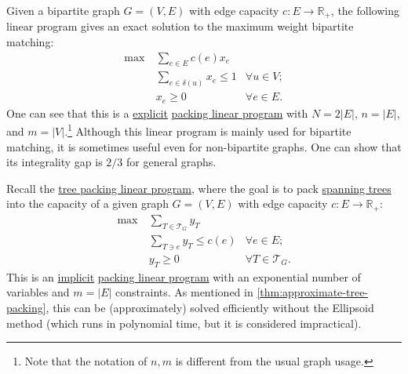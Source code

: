 \begin{eg}\label{eg:max-weight-bipartite-matching-MWU}
	Given a bipartite graph \(G = (V, E)\) with edge capacity \(c \colon E \to \mathbb{R} _{+}\), the following linear program gives an exact solution to the maximum weight bipartite matching:
	\[
		\begin{aligned}
			\max~ & \sum_{e \in E} c(e) x_e                                \\
			      & \sum_{e \in \delta (u)} x_e \leq 1 & \forall u \in V ; \\
			      & x_e \geq 0                         & \forall e \in E.
		\end{aligned}
	\]
	One can see that this is a \hyperref[def:explicit-LP]{explicit} \hyperref[def:packing-LP]{packing linear program} with \(N = 2 \lvert E \rvert \), \(n = \lvert E \rvert \), and \(m = \lvert V \rvert \).\footnote{Note that the notation of \(n, m\) is different from the usual graph usage.} Although this linear program is mainly used for bipartite matching, it is sometimes useful even for non-bipartite graphs. One can show that its integrality gap is \(2 / 3\) for general graphs.
\end{eg}

\begin{eg}\label{eg:tree-packing-MWU}
	Recall the \hyperref[eq:tree-packing-LP]{tree packing linear program}, where the goal is to pack \hyperref[def:spanning-tree]{spanning trees} into the capacity of a given graph \(G = (V, E)\) with edge capacity \(c \colon E \to \mathbb{R} _{+}\):
	\[
		\begin{aligned}
			\max~ & \sum_{T \in \mathcal{T} _G} y_T                                 \\
			      & \sum_{T \ni e} y_T \leq c(e)    & \forall e \in E;              \\
			      & y_T \geq 0                      & \forall T \in \mathcal{T} _G.
		\end{aligned}
	\]
	This is an \hyperref[def:implicit-LP]{implicit} \hyperref[def:packing-LP]{packing linear program} with an exponential number of variables and \(m = \lvert E \rvert \) constraints. As mentioned in \autoref{thm:approximate-tree-packing}, this can be (approximately) solved efficiently without the Ellipsoid method (which runs in polynomial time, but it is considered impractical).
\end{eg}

